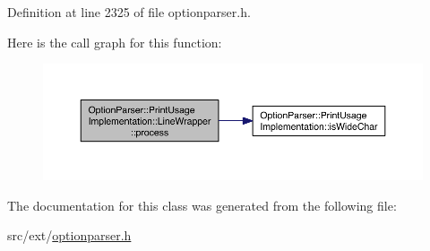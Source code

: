 Definition at line 2325 of file optionparser.\-h.



Here is the call graph for this function\-:\nopagebreak
\begin{figure}[H]
\begin{center}
\leavevmode
\includegraphics[width=350pt]{class_option_parser_1_1_print_usage_implementation_1_1_line_wrapper_adf252f2ddcbaafa69352e86e364c7c72_cgraph}
\end{center}
\end{figure}




The documentation for this class was generated from the following file\-:\begin{DoxyCompactItemize}
\item 
src/ext/\hyperlink{optionparser_8h}{optionparser.\-h}\end{DoxyCompactItemize}
